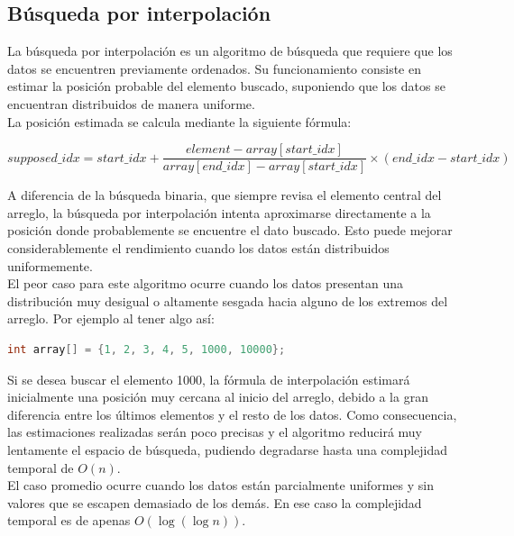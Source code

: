 \subsection{Búsqueda por interpolación}

La búsqueda por interpolación es un algoritmo de búsqueda que requiere que los datos se encuentren previamente ordenados. Su funcionamiento consiste en estimar la 
posición probable del elemento buscado, suponiendo que los datos se encuentran distribuidos de manera uniforme. \\

La posición estimada se calcula mediante la siguiente fórmula:

\[
supposed\_idx = start\_idx +
\frac{element - array[start\_idx]}
{array[end\_idx] - array[start\_idx]}
\times (end\_idx - start\_idx)
\]

A diferencia de la búsqueda binaria, que siempre revisa el elemento central del arreglo, la búsqueda por interpolación intenta aproximarse directamente a la posición 
donde probablemente se encuentre el dato buscado. Esto puede mejorar considerablemente el rendimiento cuando los datos están distribuidos uniformemente. \\

El peor caso para este algoritmo ocurre cuando los datos presentan una distribución muy desigual o altamente sesgada hacia alguno de los extremos del arreglo. 
Por ejemplo al tener algo así:

\begin{lstlisting}[language=C]
int array[] = {1, 2, 3, 4, 5, 1000, 10000};
\end{lstlisting}

Si se desea buscar el elemento 1000, la fórmula de interpolación estimará inicialmente una posición muy cercana al inicio del arreglo, debido a la gran diferencia 
entre los últimos elementos y el resto de los datos. Como consecuencia, las estimaciones realizadas serán poco precisas y el algoritmo reducirá muy lentamente el 
espacio de búsqueda, pudiendo degradarse hasta una complejidad temporal de $O(n)$. \\

El caso promedio ocurre cuando los datos están parcialmente uniformes y sin valores que se escapen demasiado de los demás.   En ese caso la complejidad temporal es 
de apenas $O(\log (\log n))$. \\

